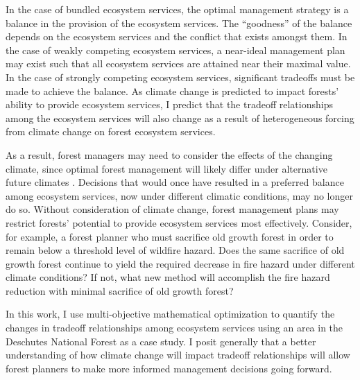 In the case of bundled ecosystem services, the optimal management strategy is a balance in the provision of the ecosystem services. The ``goodness'' of the balance depends on the ecosystem services and the conflict that exists amongst them. In the case of weakly competing ecosystem services, a near-ideal management plan may exist such that all ecosystem services are attained near their maximal value. In the case of strongly competing ecosystem services, significant tradeoffs must be made to achieve the balance. As climate change is predicted to impact forests' ability to provide ecosystem services, I predict that the tradeoff relationships among the ecosystem services will also change as a result of heterogeneous forcing from climate change on forest ecosystem services.

As a result, forest managers may need to consider the effects of the changing climate, since %
optimal forest management will likely differ under alternative future climates \cite{linder2000developing}. Decisions that would once have resulted in a preferred balance among ecosystem services, now under different climatic conditions, may no longer do so. Without consideration of climate change, forest management plans may restrict forests' potential to provide ecosystem services most effectively. Consider, for example, a forest planner who must sacrifice old growth forest in order to remain below a threshold level of wildfire hazard. Does the same sacrifice of old growth forest continue to yield the required decrease in fire hazard under different climate conditions? If not, what new method will accomplish the fire hazard reduction with minimal sacrifice of old growth forest?

In this work, I use multi-objective mathematical optimization to quantify the changes in tradeoff relationships among ecosystem services using an area in the Deschutes National Forest as a case study. I posit generally that a better understanding of how climate change will impact tradeoff relationships will allow forest planners to make more informed management decisions going forward.

